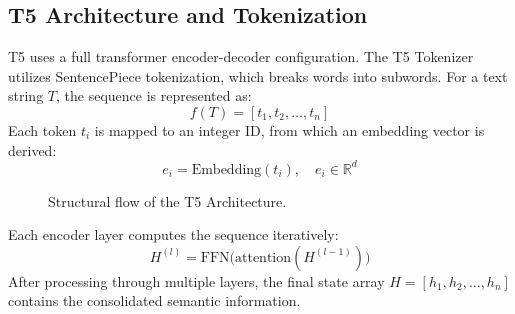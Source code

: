 \documentclass[10pt, conference]{IEEEtran}
\begin{document}
\subsection{\textbf{T5 Architecture and Tokenization}}
T5 uses a full transformer encoder-decoder configuration. The T5 Tokenizer utilizes SentencePiece tokenization, which breaks words into subwords. For a text string $T$, the sequence is represented as:
\begin{equation}
    f(T) = [t_1, t_2, \dots, t_n]
\end{equation}
Each token $t_i$ is mapped to an integer ID, from which an embedding vector is derived:
\begin{equation}
    e_i = \text{Embedding}(t_i), \quad e_i \in \mathbb{R}^d
\end{equation}

\begin{figure}[H]
\centering
{}
\caption{Structural flow of the T5 Architecture.}
\label{fig:t5_arch}
\end{figure}

Each encoder layer computes the sequence iteratively:
\begin{equation}
    H^{(l)} = \text{FFN}\big(\text{attention}(H^{(l-1)})\big)
\end{equation}
After processing through multiple layers, the final state array $H = [h_1, h_2, \dots, h_n]$ contains the consolidated semantic information.
\end{document}
